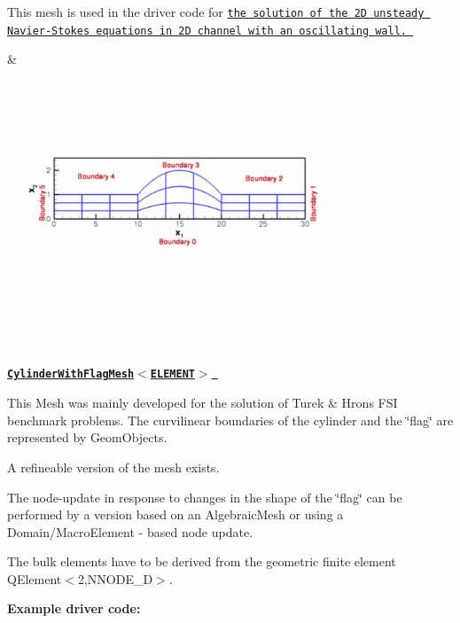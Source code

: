 \begin{center}
\begin{longtabu}
\begin{DoxyItemize}
\item This mesh is used in the driver code for \href{../../../navier_stokes/collapsible_channel/html/index.html}{\tt the solution of the 2D unsteady Navier-\/\+Stokes equations in 2D channel with an oscillating wall. }
\end{DoxyItemize}& 
\begin{DoxyImageNoCaption}
  \mbox{\includegraphics[width=0.75\textwidth]{collapsible_channel_mesh}}
\end{DoxyImageNoCaption}
   \\
\href{classoomph_1_1CylinderWithFlagMesh.html}{\tt {\bfseries  Cylinder\+With\+Flag\+Mesh$<$\+E\+L\+E\+M\+E\+N\+T$>$ }} ~\newline
~\newline

\begin{DoxyItemize}
\item This {\ttfamily Mesh} was mainly developed for the solution of Turek \& Hron\textquotesingle{}s F\+SI benchmark problems. The curvilinear boundaries of the cylinder and the \char`\"{}flag\char`\"{} are represented by {\ttfamily Geom\+Objects}.
\item A refineable version of the mesh exists.
\item The node-\/update in response to changes in the shape of the \char`\"{}flag\char`\"{} can be performed by a version based on an {\ttfamily Algebraic\+Mesh} or using a {\ttfamily Domain/\+Macro\+Element} -\/ based node update.
\item The bulk elements have to be derived from the geometric finite element {\ttfamily Q\+Element$<$2,\+N\+N\+O\+D\+E\+\_\+D$>$}.
\end{DoxyItemize}{\bfseries Example driver code\+:} ~\newline


\end{longtabu}
\end{center}
